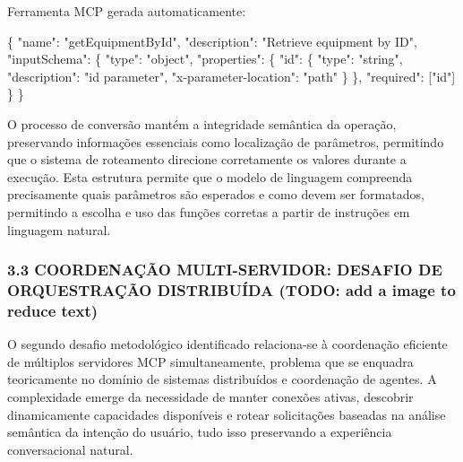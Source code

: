 \documentclass[
]{article}
\newenvironment{Shaded}{}{}
\newcommand{\DataTypeTok}[1]{\textcolor[rgb]{0.56,0.13,0.00}{#1}}
\newcommand{\FunctionTok}[1]{\textcolor[rgb]{0.02,0.16,0.49}{#1}}
\newcommand{\OtherTok}[1]{\textcolor[rgb]{0.00,0.44,0.13}{#1}}
\newcommand{\StringTok}[1]{\textcolor[rgb]{0.25,0.44,0.63}{#1}}
\begin{document}
Ferramenta MCP gerada automaticamente:

\begin{Shaded}
\begin{Highlighting}[]
\FunctionTok{\{}
  \DataTypeTok{"name"}\FunctionTok{:} \StringTok{"getEquipmentById"}\FunctionTok{,}
  \DataTypeTok{"description"}\FunctionTok{:} \StringTok{"Retrieve equipment by ID"}\FunctionTok{,}
  \DataTypeTok{"inputSchema"}\FunctionTok{:} \FunctionTok{\{}
    \DataTypeTok{"type"}\FunctionTok{:} \StringTok{"object"}\FunctionTok{,}
    \DataTypeTok{"properties"}\FunctionTok{:} \FunctionTok{\{}
      \DataTypeTok{"id"}\FunctionTok{:} \FunctionTok{\{}
        \DataTypeTok{"type"}\FunctionTok{:} \StringTok{"string"}\FunctionTok{,}
        \DataTypeTok{"description"}\FunctionTok{:} \StringTok{"id parameter"}\FunctionTok{,}
        \DataTypeTok{"x{-}parameter{-}location"}\FunctionTok{:} \StringTok{"path"}
      \FunctionTok{\}}
    \FunctionTok{\},}
    \DataTypeTok{"required"}\FunctionTok{:} \OtherTok{[}\StringTok{"id"}\OtherTok{]}
  \FunctionTok{\}}
\FunctionTok{\}}
\end{Highlighting}
\end{Shaded}

O processo de conversão mantém a integridade semântica da operação,
preservando informações essenciais como localização de parâmetros,
permitindo que o sistema de roteamento direcione corretamente os valores
durante a execução. Esta estrutura permite que o modelo de linguagem
compreenda precisamente quais parâmetros são esperados e como devem ser
formatados, permitindo a escolha e uso das funções corretas a partir de
instruções em linguagem natural.

\subsubsection{3.3 COORDENAÇÃO MULTI-SERVIDOR: DESAFIO DE ORQUESTRAÇÃO
DISTRIBUÍDA (TODO: add a image to reduce
text)}\label{coordenauxe7uxe3o-multi-servidor-desafio-de-orquestrauxe7uxe3o-distribuuxedda-todo-add-a-image-to-reduce-text}

O segundo desafio metodológico identificado relaciona-se à coordenação
eficiente de múltiplos servidores MCP simultaneamente, problema que se
enquadra teoricamente no domínio de sistemas distribuídos e coordenação
de agentes. A complexidade emerge da necessidade de manter conexões
ativas, descobrir dinamicamente capacidades disponíveis e rotear
solicitações baseadas na análise semântica da intenção do usuário, tudo
isso preservando a experiência conversacional natural.
\end{document}
